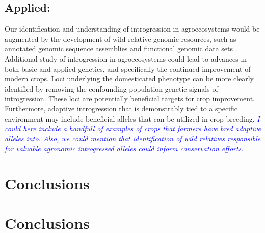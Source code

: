 \documentclass[11pt]{article}
\newcommand{\gmj}[1]{\textcolor{blue}{ \emph{\scriptsize  #1}} } %
\begin{document}
\subsection*{Applied:}
Our identification and understanding of introgression in agroecosystems would be augmented by the development of wild relative genomic resources, such as annotated genomic sequence assemblies and functional genomic data sets \cite{huang2012}.
Additional study of introgression in agroecosystems could lead to advances in both basic and applied genetics, and specifically the continued improvement of modern crops.
Loci underlying the domesticated phenotype can be more clearly identified by removing the confounding population genetic signals of introgression.
These loci are potentially beneficial targets for crop improvement.
Furthermore, adaptive introgression that is demonstrably tied to a specific environment may include beneficial alleles that can be utilized in crop breeding.
\gmj{I could here include a handfull of examples of crops that farmers have bred adaptive alleles into.  Also, we could mention that identification of wild relatives responsible for valuable agronomic introgressed alleles could inform conservation efforts.}














\section*{Conclusions}


\section*{Conclusions}
\end{document}

